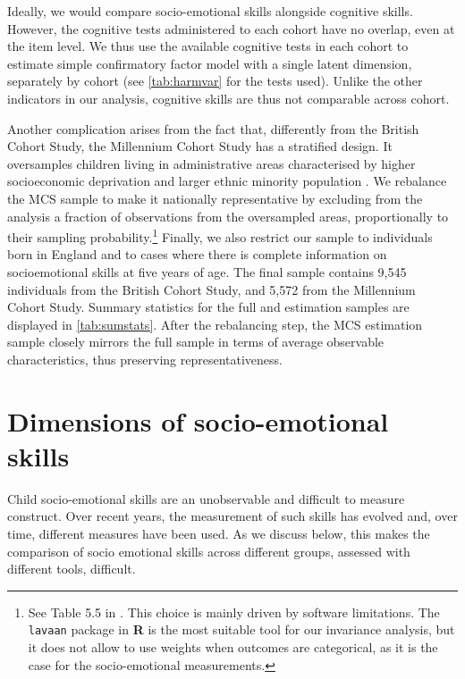 Ideally, we would compare socio-emotional skills alongside cognitive skills. However, the cognitive tests administered to each cohort have no overlap, even at the item level. We thus use the available cognitive tests in each cohort to estimate simple confirmatory factor model with a single latent dimension, separately by cohort (see \autoref{tab:harmvar} for the tests used). Unlike the other indicators in our analysis, cognitive skills are thus not comparable across cohort. 

Another complication arises from the fact that, differently from the British Cohort Study, the Millennium Cohort Study has a stratified design. It oversamples children living in administrative areas characterised by higher socioeconomic deprivation and larger ethnic minority population \citep{Plewis2007}. We rebalance the MCS sample to make it nationally representative by excluding from the analysis a fraction of observations from the oversampled areas, proportionally to their sampling probability.\footnote{See Table 5.5 in \citet{Plewis2007}. This choice is mainly driven by software limitations. The \texttt{lavaan} package in \textbf{\textsf{R}} \citep{Rosseel2012} is the most suitable tool for our invariance analysis, but it does not allow to use weights when outcomes are categorical, as it is the case for the socio-emotional measurements.} Finally, we also restrict our sample to individuals born in England and to cases where there is complete information on socioemotional skills at five years of age. The final sample contains 9,545 individuals from the British Cohort Study, and 5,572 from the Millennium Cohort Study. Summary statistics for the full and estimation samples are displayed in \autoref{tab:sumstats}. After the rebalancing step, the MCS estimation sample closely mirrors the full sample in terms of average observable characteristics, thus preserving representativeness.

\section{Dimensions of  socio-emotional skills \label{sec:methods}}

Child socio-emotional skills are an unobservable and difficult to measure construct. Over recent years, the measurement of such skills has evolved and, over time, different measures have been used.  As we discuss below, this makes the comparison  of socio emotional skills across different groups, assessed with different tools, difficult.

